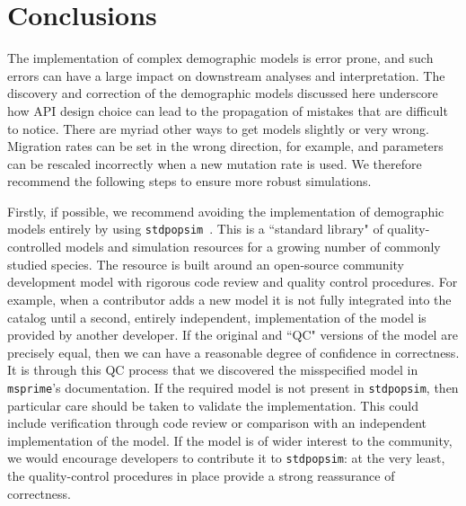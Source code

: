 \documentclass{article}
\newcommand{\msprime}[0]{\texttt{msprime}}
\newcommand{\stdpopsim}[0]{\texttt{stdpopsim}}
\begin{document}
\section*{Conclusions}

The implementation of complex demographic models is error prone, and such errors
can have a large impact on downstream analyses and interpretation.
The discovery and correction of the demographic models discussed here underscore
how API design choice can lead to the propagation of mistakes that are difficult to notice.
There are myriad other ways to get models slightly or very wrong. Migration
rates can be set in the wrong direction, for example, and parameters can be
rescaled incorrectly when a new mutation rate is used.
We therefore recommend the following steps to ensure more robust simulations.

Firstly, if possible, we recommend avoiding the implementation of
demographic models entirely by using \stdpopsim~\citep{adrion2019community}.
This is a ``standard library" of quality-controlled
models and simulation resources for a growing number of commonly studied species.
The resource is built around an open-source community development model
with rigorous code review and quality control procedures.
For example, when a contributor adds a new model it is not fully integrated
into the catalog until a second, entirely independent, implementation of the
model is provided by another developer. If the original and ``QC" versions
of the model are precisely equal, then we can have a reasonable degree
of confidence in correctness. It is through this QC process that we discovered
the misspecified model in \msprime's documentation.
If the required model is not present in \stdpopsim, then particular care should
be taken to validate the implementation.
This could include verification through code review or comparison with an
independent implementation of the model. If the model is of wider interest to
the community, we would encourage developers to contribute it to \stdpopsim:
at the very least, the quality-control procedures in place provide a strong
reassurance of correctness.
\end{document}
